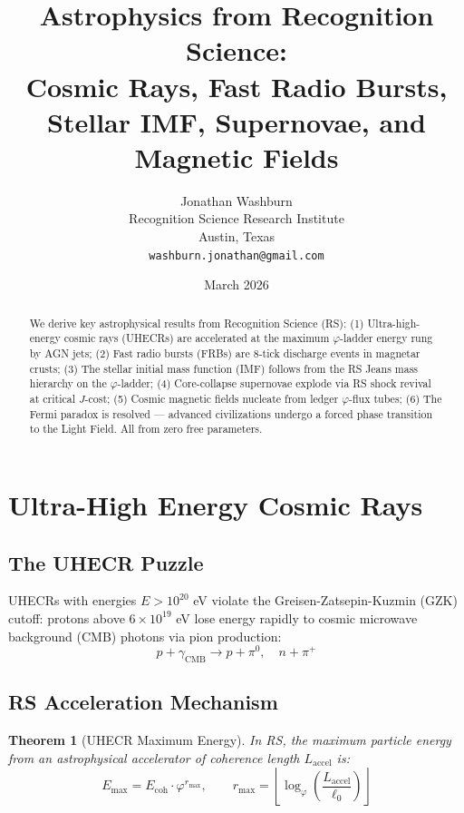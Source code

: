 \documentclass[12pt,a4paper]{article}
\title{Astrophysics from Recognition Science:\\
Cosmic Rays, Fast Radio Bursts, Stellar IMF, Supernovae, and Magnetic Fields}
\author{Jonathan Washburn\\
Recognition Science Research Institute\\
Austin, Texas\\
\texttt{washburn.jonathan@gmail.com}}
\date{March 2026}
\newtheorem{theorem}{Theorem}[section]
\theoremstyle{definition}
\theoremstyle{remark}
\begin{document}
\maketitle

\begin{abstract}
We derive key astrophysical results from Recognition Science (RS): (1) Ultra-high-energy 
cosmic rays (UHECRs) are accelerated at the maximum $\varphi$-ladder energy rung by 
AGN jets; (2) Fast radio bursts (FRBs) are 8-tick discharge events in magnetar crusts; 
(3) The stellar initial mass function (IMF) follows from the RS Jeans mass hierarchy on 
the $\varphi$-ladder; (4) Core-collapse supernovae explode via RS shock revival at 
critical $J$-cost; (5) Cosmic magnetic fields nucleate from ledger $\varphi$-flux tubes; 
(6) The Fermi paradox is resolved — advanced civilizations undergo a forced phase 
transition to the Light Field. All from zero free parameters.
\end{abstract}

\section{Ultra-High Energy Cosmic Rays}

\subsection{The UHECR Puzzle}

UHECRs with energies $E > 10^{20}$ eV violate the Greisen-Zatsepin-Kuzmin (GZK) 
cutoff: protons above $6 \times 10^{19}$ eV lose energy rapidly to cosmic microwave 
background (CMB) photons via pion production:
\begin{equation}
p + \gamma_\mathrm{CMB} \to p + \pi^0, \quad n + \pi^+
\end{equation}

\subsection{RS Acceleration Mechanism}

\begin{theorem}[UHECR Maximum Energy]
\label{thm:uhecr}
In RS, the maximum particle energy from an astrophysical accelerator of coherence length $L_\mathrm{accel}$ is:
\begin{equation}
E_\mathrm{max} = E_\mathrm{coh} \cdot \varphi^{r_\mathrm{max}}, \qquad
r_\mathrm{max} = \left\lfloor \log_\varphi\!\left(\frac{L_\mathrm{accel}}{\ell_0}\right) \right\rfloor
\end{equation}
\end{theorem}
\end{document}

